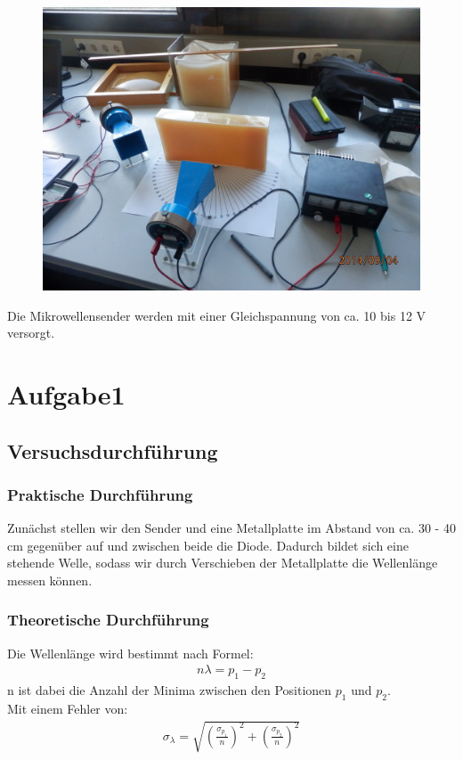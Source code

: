 \documentclass[12pt]{scrartcl}
\begin{document}
\begin{figure}[H]
	\centering
	\includegraphics[scale= 0.1]{versuchaufbau.JPG}
	\label{fig:versuchsaufbau}
\end{figure}

Die Mikrowellensender werden mit einer Gleichspannung von ca. 10 bis 12 V versorgt.
\section{Aufgabe1}
\subsection{Versuchsdurchführung}
\subsubsection{Praktische Durchführung}
Zunächst stellen wir den Sender und eine Metallplatte im Abstand von ca. 30 - 40 cm gegenüber auf und zwischen beide die Diode. Dadurch bildet sich eine stehende Welle, sodass wir durch Verschieben der Metallplatte die Wellenlänge messen können.
\subsubsection{Theoretische Durchführung}
Die Wellenlänge wird bestimmt nach Formel:
\begin{align}
n\lambda = p_1 - p_2
\label{eqn:a_1}
\end{align}
n ist dabei die Anzahl der Minima zwischen den Positionen $p_1$ und $p_2$.\\
Mit einem Fehler von:
\begin{align}
\sigma_{\lambda} = \sqrt{
\left(\frac{\sigma_{p_1}}{n}\right)^2+
\left(\frac{\sigma_{p_2}}{n}\right)^2}
\label{eqn:a_1_sigma}
\end{align}
\end{document}
